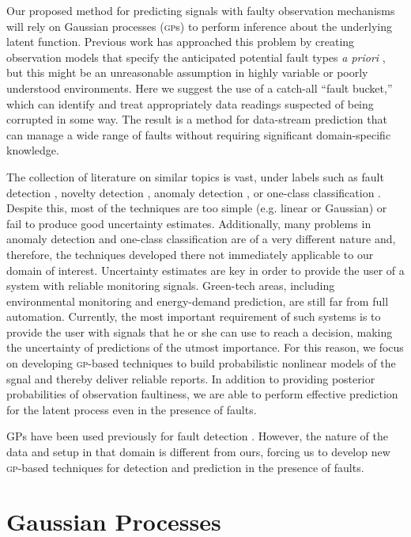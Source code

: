 \documentclass{article}
\newcommand{\acro}[1]{\textsc{#1}}
\begin{document}
Our proposed method for predicting signals with faulty observation
mechanisms will rely on Gaussian processes (\acro{gp}s) to perform
inference about the underlying latent function.  Previous work has
approached this problem by creating observation models that specify
the anticipated potential fault types \textit{a priori}
\citep{garnettosborne}, but this might be an unreasonable assumption
in highly variable or poorly understood environments.  Here we suggest
the use of a catch-all ``fault bucket,'' which can identify and treat
appropriately data readings suspected of being corrupted in some way.
The result is a method for data-stream prediction that can manage a
wide range of faults without requiring significant
domain-specific knowledge.

The collection of literature on similar topics is vast, under labels
such as fault detection \citep{deFreitas1996, Eciolaza2001,
  Isermann2005, Ding2008}, novelty detection \citep{Markou2003},
anomaly detection \citep{Chandola:2009}, or one-class classification
\citep{Khan2010}. Despite this, most of the techniques are too simple
(e.g. linear or Gaussian) or fail to produce good uncertainty
estimates. Additionally, many problems in anomaly detection and
one-class classification are of a very different nature and,
therefore, the techniques developed there not immediately
applicable to our domain of interest. Uncertainty estimates are key in
order to provide the user of a system with reliable monitoring
signals. Green-tech areas, including environmental monitoring and
energy-demand prediction, are still far from full
automation. Currently, the most important requirement of such systems
is to provide the user with signals that he or she can use to reach a
decision, making the uncertainty of predictions of the utmost
importance. For this reason, we focus on developing \acro{gp}-based
techniques to build probabilistic nonlinear models of the sgnal and thereby deliver reliable reports.  In addition to
providing posterior probabilities of observation faultiness, we are
able to perform effective prediction for the latent process even in
the presence of faults.

GPs have been used previously for fault detection
\citep{Eciolaza2001}. However, the nature of the data and setup in
that domain is different from ours, forcing us to develop new
\acro{gp}-based techniques for detection and prediction in the
presence of faults.

\section{Gaussian Processes}
\end{document}
